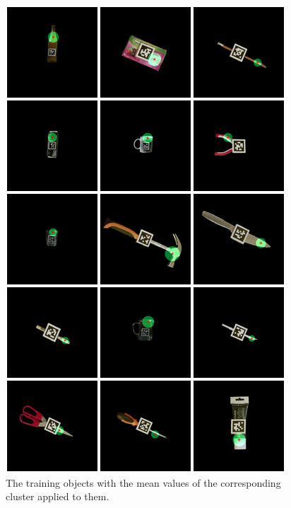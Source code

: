 \begin{figure}
	\centering
	\includegraphics[width=\textwidth]{img/results/objects.jpg}
	\caption{The training objects with the mean values of the corresponding cluster applied to them.}
	\label{fig:results_objects}
\end{figure}



%

